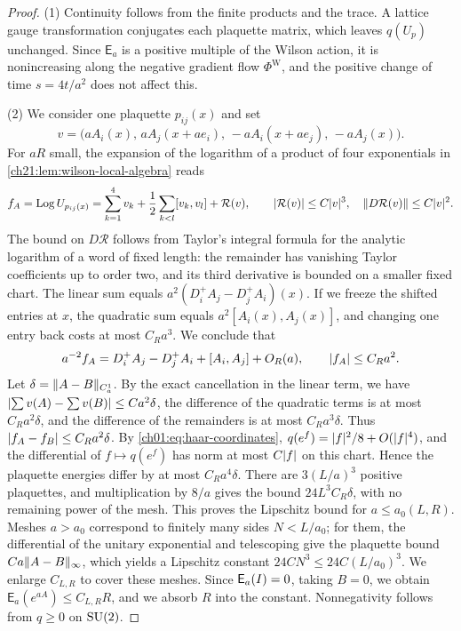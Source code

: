 \begin{proof}
(1) Continuity follows from the finite products and the trace. A lattice gauge transformation conjugates each plaquette matrix, which leaves $q(U_p)$ unchanged. Since $\mathsf E_a$ is a positive multiple of the Wilson action, it is nonincreasing along the negative gradient flow $\Phi^{\mathrm W}$, and the positive change of time $s=4t/a^2$ does not affect this.

(2) We consider one plaquette $p_{ij}(x)$ and set
\[
 v=\bigl(aA_i(x),\,aA_j(x+ae_i),\,-aA_i(x+ae_j),\,-aA_j(x)\bigr).
\]
For $aR$ small, the expansion of the logarithm of a product of four exponentials in \cref{ch21:lem:wilson-local-algebra} reads
\[
 f_A=\operatorname{Log} U_{p_{ij}(x)}=\sum_{k=1}^4v_k+\frac12\sum_{k<l}[v_k,v_l]+\mathcal R(v),\qquad \lvert \mathcal R(v)\rvert\le C\lvert v\rvert^3,\quad \lVert D\mathcal R(v)\rVert\le C\lvert v\rvert^2 .
\]
The bound on $D\mathcal R$ follows from Taylor's integral formula for the analytic logarithm of a word of fixed length: the remainder has vanishing Taylor coefficients up to order two, and its third derivative is bounded on a smaller fixed chart. The linear sum equals $a^2(D_i^+A_j-D_j^+A_i)(x)$. If we freeze the shifted entries at $x$, the quadratic sum equals $a^2[A_i(x),A_j(x)]$, and changing one entry back costs at most $C_Ra^3$. We conclude that
\begin{equation}\label{ch26:eq:physical-plaquette-expansion}
 a^{-2}f_A=D_i^+A_j-D_j^+A_i+[A_i,A_j]+O_R(a),\qquad \lvert f_A\rvert\le C_Ra^2 .
\end{equation}
Let $\delta=\lVert A-B\rVert_{C_a^1}$. By the exact cancellation in the linear term, we have $\lvert \sum v(A)-\sum v(B)\rvert\le Ca^2\delta$, the difference of the quadratic terms is at most $C_Ra^2\delta$, and the difference of the remainders is at most $C_Ra^3\delta$. Thus $\lvert f_A-f_B\rvert\le C_Ra^2\delta$. By \eqref{ch01:eq:haar-coordinates}, $q(e^f)=\lvert f\rvert^2/8+O(\lvert f\rvert^4)$, and the differential of $f\mapsto q(e^f)$ has norm at most $C\lvert f\rvert$ on this chart. Hence the plaquette energies differ by at most $C_Ra^4\delta$. There are $3(L/a)^3$ positive plaquettes, and multiplication by $8/a$ gives the bound $24L^3C_R\delta$, with no remaining power of the mesh. This proves the Lipschitz bound for $a\le a_0(L,R)$. Meshes $a>a_0$ correspond to finitely many sides $N<L/a_0$; for them, the differential of the unitary exponential and telescoping give the plaquette bound $Ca\lVert A-B\rVert_\infty$, which yields a Lipschitz constant $24CN^3\le24C(L/a_0)^3$. We enlarge $C_{L,R}$ to cover these meshes. Since $\mathsf E_a(I)=0$, taking $B=0$, we obtain $\mathsf E_a(e^{aA})\le C_{L,R}R$, and we absorb $R$ into the constant. Nonnegativity follows from $q\ge0$ on $\mathrm{SU}(2)$.


\end{proof}
